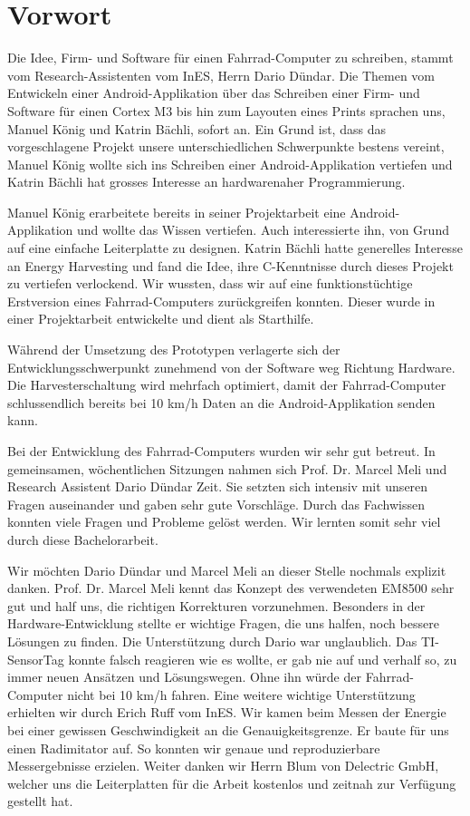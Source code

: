 \chapter*{Vorwort}

Die Idee, Firm- und Software für einen Fahrrad-Computer zu schreiben, stammt vom Research-Assistenten vom InES, Herrn Dario Dündar. Die Themen vom Entwickeln einer Android-Applikation über das Schreiben einer Firm- und Software für einen Cortex M3 bis hin zum Layouten eines Prints sprachen uns, Manuel König und Katrin Bächli, sofort an. Ein Grund ist, dass das vorgeschlagene Projekt unsere unterschiedlichen Schwerpunkte bestens vereint, Manuel König wollte sich ins Schreiben einer Android-Applikation vertiefen und Katrin Bächli hat grosses Interesse an hardwarenaher Programmierung. 

Manuel König erarbeitete bereits in seiner Projektarbeit eine Android-Applikation und wollte das Wissen vertiefen. Auch interessierte ihn, von Grund auf eine einfache Leiterplatte zu designen. Katrin Bächli hatte generelles Interesse an Energy Harvesting und fand die Idee, ihre C-Kenntnisse durch dieses Projekt zu vertiefen verlockend. Wir wussten, dass wir auf eine funktionstüchtige Erstversion eines Fahrrad-Computers zurückgreifen konnten. Dieser wurde in einer Projektarbeit entwickelte und dient als Starthilfe. 

Während der Umsetzung des Prototypen verlagerte sich der Entwicklungsschwerpunkt zunehmend von der Software weg Richtung Hardware. Die Harvesterschaltung wird mehrfach optimiert, damit der Fahrrad-Computer schlussendlich bereits bei 10 km/h Daten an die Android-Applikation senden kann. 

Bei der Entwicklung des Fahrrad-Computers wurden wir sehr gut betreut. In gemeinsamen, wöchentlichen Sitzungen nahmen sich Prof. Dr. Marcel Meli und Research Assistent Dario Dündar Zeit. Sie setzten sich intensiv mit unseren Fragen auseinander und gaben sehr gute Vorschläge. Durch das Fachwissen konnten viele Fragen und Probleme gelöst werden. Wir lernten somit sehr viel durch diese Bachelorarbeit. 

Wir möchten Dario Dündar und Marcel Meli an dieser Stelle nochmals explizit danken. Prof. Dr. Marcel Meli kennt das Konzept des verwendeten EM8500 sehr gut und half uns, die richtigen Korrekturen vorzunehmen. Besonders in der Hardware-Entwicklung stellte er wichtige Fragen, die uns halfen, noch bessere Lösungen zu finden. Die Unterstützung durch Dario war unglaublich. Das TI-SensorTag konnte falsch reagieren wie es wollte, er gab nie auf und verhalf so, zu immer neuen Ansätzen und Lösungswegen. Ohne ihn würde der Fahrrad-Computer nicht bei 10 km/h fahren. Eine weitere wichtige Unterstützung erhielten wir durch Erich Ruff vom InES. Wir kamen beim Messen der Energie bei einer gewissen Geschwindigkeit an die Genauigkeitsgrenze. Er baute für uns einen Radimitator auf. So konnten wir genaue und reproduzierbare Messergebnisse erzielen. Weiter danken wir Herrn Blum von Delectric GmbH, welcher uns die Leiterplatten für die Arbeit kostenlos und zeitnah zur Verfügung gestellt hat. 

